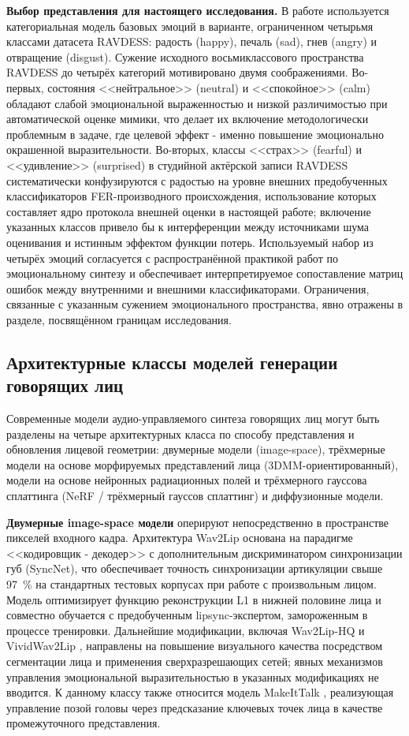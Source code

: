 \documentclass[a4paper, 12pt, oneside, openany]{article}
\begin{document}
\textbf{Выбор представления для настоящего исследования.} В работе используется категориальная модель базовых эмоций в варианте, ограниченном четырьмя классами датасета RAVDESS: радость (happy), печаль (sad), гнев (angry) и отвращение (disgust). Сужение исходного восьмиклассового пространства RAVDESS до четырёх категорий мотивировано двумя соображениями. Во-первых, состояния <<нейтральное>> (neutral) и <<спокойное>> (calm) обладают слабой эмоциональной выраженностью и низкой различимостью при автоматической оценке мимики, что делает их включение методологически проблемным в задаче, где целевой эффект - именно повышение эмоционально окрашенной выразительности. Во-вторых, классы <<страх>> (fearful) и <<удивление>> (surprised) в студийной актёрской записи RAVDESS систематически конфузируются с радостью на уровне внешних предобученных классификаторов FER-производного происхождения, использование которых составляет ядро протокола внешней оценки в настоящей работе; включение указанных классов привело бы к интерференции между источниками шума оценивания и истинным эффектом функции потерь. Используемый набор из четырёх эмоций согласуется с распространённой практикой работ по эмоциональному синтезу \cite{ji2022eamm,wang2023eat} и обеспечивает интерпретируемое сопоставление матриц ошибок между внутренними и внешними классификаторами. Ограничения, связанные с указанным сужением эмоционального пространства, явно отражены в разделе, посвящённом границам исследования.

\subsection{Архитектурные классы моделей генерации говорящих лиц}

Современные модели аудио-управляемого синтеза говорящих лиц могут быть разделены на четыре архитектурных класса по способу представления и обновления лицевой геометрии: двумерные модели (image-space), трёхмерные модели на основе морфируемых представлений лица (3DMM-ориентированный), модели на основе нейронных радиационных полей и трёхмерного гауссова сплаттинга (NeRF / трёхмерный гауссов сплаттинг) и диффузионные модели.

\textbf{Двумерные image-space модели} оперируют непосредственно в пространстве пикселей входного кадра. Архитектура Wav2Lip \cite{prajwal2020wav2lip} основана на парадигме <<кодировщик - декодер>> с дополнительным дискриминатором синхронизации губ (SyncNet), что обеспечивает точность синхронизации артикуляции свыше 97~\% на стандартных тестовых корпусах при работе с произвольным лицом. Модель оптимизирует функцию реконструкции L1 в нижней половине лица и совместно обучается с предобученным lipsync-экспертом, замороженным в процессе тренировки. Дальнейшие модификации, включая Wav2Lip-HQ \cite{mallikarjuna2025wav2liphq} и VividWav2Lip \cite{liu2024vividwav2lip}, направлены на повышение визуального качества посредством сегментации лица и применения сверхразрешающих сетей; явных механизмов управления эмоциональной выразительностью в указанных модификациях не вводится. К данному классу также относится модель MakeItTalk \cite{zhou2020makeittalk}, реализующая управление позой головы через предсказание ключевых точек лица в качестве промежуточного представления.
\end{document}

